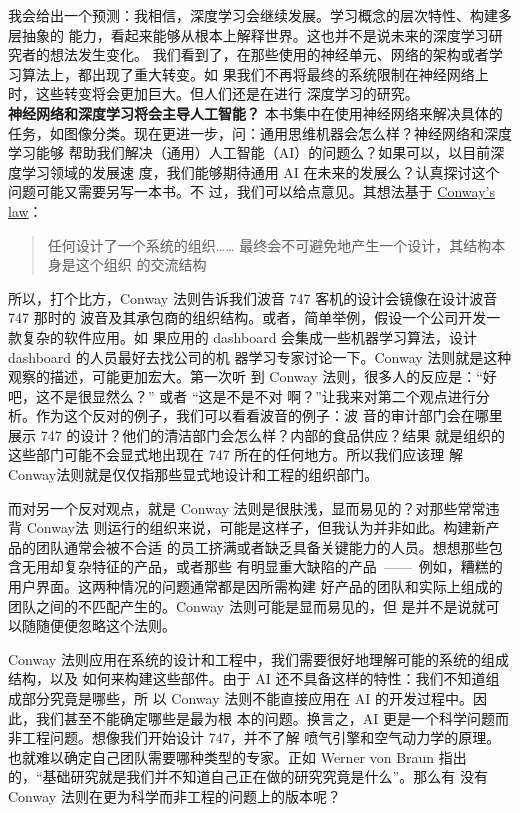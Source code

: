 我会给出一个预测：我相信，深度学习会继续发展。学习概念的层次特性、构建多层抽象的
能力，看起来能够从根本上解释世界。这也并不是说未来的深度学习研究者的想法发生变化。
我们看到了，在那些使用的神经单元、网络的架构或者学习算法上，都出现了重大转变。如
果我们不再将最终的系统限制在神经网络上时，这些转变将会更加巨大。但人们还是在进行
深度学习的研究。\\

\textbf{神经网络和深度学习将会主导人工智能？} 本书集中在使用神经网络来解决具体的
任务，如图像分类。现在更进一步，问：通用思维机器会怎么样？神经网络和深度学习能够
帮助我们解决（通用）人工智能（AI）的问题么？如果可以，以目前深度学习领域的发展速
度，我们能够期待通用 AI 在未来的发展么？认真探讨这个问题可能又需要另写一本书。不
过，我们可以给点意见。其想法基于
\href{http://en.wikipedia.org/wiki/Conway%27s_law}{Conway's law}：

\begin{quote}
任何设计了一个系统的组织…… 最终会不可避免地产生一个设计，其结构本身是这个组织
的交流结构
\end{quote}

所以，打个比方，Conway 法则告诉我们波音 747 客机的设计会镜像在设计波音 747 那时的
波音及其承包商的组织结构。或者，简单举例，假设一个公司开发一款复杂的软件应用。如
果应用的 dashboard 会集成一些机器学习算法，设计 dashboard 的人员最好去找公司的机
器学习专家讨论一下。Conway 法则就是这种观察的描述，可能更加宏大。第一次听
到 Conway 法则，很多人的反应是：“好吧，这不是很显然么？” 或者 “这是不是不对
啊？”让我来对第二个观点进行分析。作为这个反对的例子，我们可以看看波音的例子：波
音的审计部门会在哪里展示 747 的设计？他们的清洁部门会怎么样？内部的食品供应？结果
就是组织的这些部门可能不会显式地出现在 747 所在的任何地方。所以我们应该理
解 Conway法则就是仅仅指那些显式地设计和工程的组织部门。

而对另一个反对观点，就是 Conway 法则是很肤浅，显而易见的？对那些常常违背 Conway法
则运行的组织来说，可能是这样子，但我认为并非如此。构建新产品的团队通常会被不合适
的员工挤满或者缺乏具备关键能力的人员。想想那些包含无用却复杂特征的产品，或者那些
有明显重大缺陷的产品~——~例如，糟糕的用户界面。这两种情况的问题通常都是因所需构建
好产品的团队和实际上组成的团队之间的不匹配产生的。Conway 法则可能是显而易见的，但
是并不是说就可以随随便便忽略这个法则。

Conway 法则应用在系统的设计和工程中，我们需要很好地理解可能的系统的组成结构，以及
如何来构建这些部件。由于 AI 还不具备这样的特性：我们不知道组成部分究竟是哪些，所
以 Conway 法则不能直接应用在 AI 的开发过程中。因此，我们甚至不能确定哪些是最为根
本的问题。换言之，AI 更是一个科学问题而非工程问题。想像我们开始设计 747，并不了解
喷气引擎和空气动力学的原理。也就难以确定自己团队需要哪种类型的专家。正如 Werner
von Braun 指出的，“基础研究就是我们并不知道自己正在做的研究究竟是什么”。那么有
没有 Conway 法则在更为科学而非工程的问题上的版本呢？

